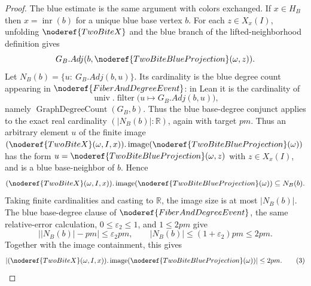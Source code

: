\begin{proof}
The blue estimate is the same argument with colors exchanged.  If \(x\in H_B\)
then \(x=\operatorname{inr}(b)\) for a unique blue base vertex \(b\).  For
each \(z\in X_x(I)\), unfolding \(\noderef{TwoBiteX}\) and the blue branch of
the lifted-neighborhood definition gives
\[
G_B.Adj(b,\noderef{TwoBiteBlueProjection}(\omega,z)).
\]
Let \(N_B(b)=\{u:\ G_B.Adj(b,u)\}\).  Its cardinality is the blue degree count
appearing in \(\noderef{FiberAndDegreeEvent}\): in Lean it is the cardinality
of
\[
\operatorname{univ}.\operatorname{filter}
  \bigl(u\mapsto G_B.Adj(b,u)\bigr),
\]
namely \(\operatorname{GraphDegreeCount}(G_B,b)\).  Thus the blue
base-degree conjunct applies to the exact real cardinality
\((|N_B(b)|:\mathbb R)\), again with target \(pm\).
Thus an arbitrary element \(u\) of the finite image
\((\noderef{TwoBiteX}(\omega,I,x)).\operatorname{image}
      (\noderef{TwoBiteBlueProjection}(\omega))\)
has the form \(u=\noderef{TwoBiteBlueProjection}(\omega,z)\) with
\(z\in X_x(I)\), and is a blue base-neighbor of \(b\).  Hence
\[
(\noderef{TwoBiteX}(\omega,I,x)).\operatorname{image}
      (\noderef{TwoBiteBlueProjection}(\omega))
\subseteq N_B(b).
\]
Taking finite cardinalities and casting to \(\mathbb R\), the image size is at
most \(|N_B(b)|\).  The blue base-degree clause of
\(\noderef{FiberAndDegreeEvent}\), the same relative-error calculation,
\(0\le\varepsilon_2\le1\), and \(1\le2pm\) give
\[
\bigl||N_B(b)|-pm\bigr|\le\varepsilon_2pm,\qquad
|N_B(b)|\le(1+\varepsilon_2)pm\le2pm.
\]
Together with the image containment, this gives
\[
|(\noderef{TwoBiteX}(\omega,I,x)).\operatorname{image}
      (\noderef{TwoBiteBlueProjection}(\omega))|
\le2pm. \tag{3}
\]


\end{proof}
